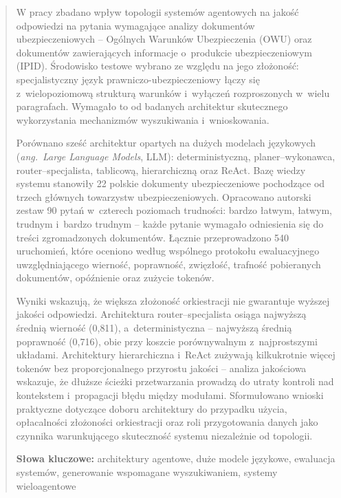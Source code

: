 \begin{abstract}
  W pracy zbadano wpływ topologii systemów agentowych na jakość odpowiedzi
  na pytania wymagające analizy dokumentów ubezpieczeniowych -- Ogólnych Warunków
  Ubezpieczenia (OWU) oraz dokumentów zawierających informacje o~produkcie
  ubezpieczeniowym (IPID).  Środowisko testowe wybrano ze względu na jego złożoność: specjalistyczny
  język prawniczo-ubezpieczeniowy łączy się z~wielopoziomową strukturą warunków
  i~wyłączeń rozproszonych w~wielu paragrafach. Wymagało to od badanych
  architektur skutecznego wykorzystania mechanizmów wyszukiwania i~wnioskowania.

  Porównano sześć architektur opartych na dużych modelach językowych
  (\textit{ang.}~\textit{Large Language Models}, LLM): deterministyczną,
  planer--wykonawca, router--specjalista, tablicową, hierarchiczną oraz ReAct.
  Bazę wiedzy systemu stanowiły 22 polskie dokumenty ubezpieczeniowe pochodzące
  od trzech głównych towarzystw ubezpieczeniowych. Opracowano autorski zestaw 90
  pytań w~czterech poziomach trudności: bardzo łatwym, łatwym, trudnym i~bardzo
  trudnym -- każde pytanie wymagało odniesienia się do treści zgromadzonych
  dokumentów. Łącznie przeprowadzono 540 uruchomień, które oceniono według
  wspólnego protokołu ewaluacyjnego uwzględniającego wierność, poprawność,
  zwięzłość, trafność pobieranych dokumentów, opóźnienie oraz zużycie tokenów.

  Wyniki wskazują, że większa złożoność orkiestracji nie gwarantuje wyższej
  jakości odpowiedzi. Architektura router--specjalista osiąga najwyższą średnią
  wierność (0{,}811), a~deterministyczna -- najwyższą średnią poprawność
  (0{,}716), obie przy koszcie porównywalnym z~najprostszymi układami.
  Architektury hierarchiczna i~ReAct zużywają kilkukrotnie więcej tokenów bez
  proporcjonalnego przyrostu jakości -- analiza jakościowa wskazuje, że dłuższe
  ścieżki przetwarzania prowadzą do utraty kontroli nad kontekstem i~propagacji
  błędu między modułami. Sformułowano wnioski praktyczne dotyczące doboru
  architektury do przypadku użycia, opłacalności złożoności orkiestracji oraz
  roli przygotowania danych jako czynnika warunkującego skuteczność systemu
  niezależnie od topologii.

  \bigskip
  \noindent\textbf{Słowa kluczowe:} architektury agentowe, duże modele językowe, ewaluacja systemów, generowanie wspomagane wyszukiwaniem, systemy wieloagentowe
\end{abstract}
